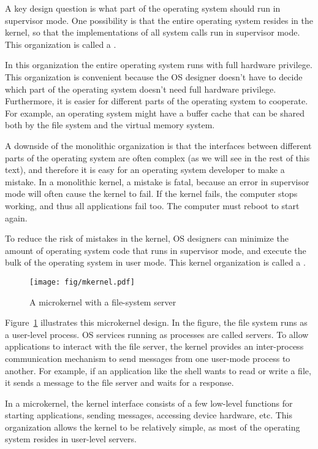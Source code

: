 A key design question is what part of the operating
system should run in supervisor mode. 
One possibility is that the entire operating system resides
in the kernel, so that the implementations of all system calls
run in supervisor mode.
This organization is called a
.

In this organization the entire operating system runs with full hardware
privilege. This organization is convenient because the OS designer doesn't have
to decide which part of the operating system doesn't need full hardware
privilege.  Furthermore, it is easier for different parts of the operating system to
cooperate.  For example, an operating system might have a buffer cache that can
be shared both by the file system and the virtual memory system. 

A downside of the monolithic organization is that the interfaces between
different parts of the operating system are often complex (as we will see in the
rest of this text), and therefore it is easy for an operating system developer
to make a mistake.  In a monolithic kernel, a mistake is fatal, because an error
in supervisor mode will often cause the kernel to fail.  If the kernel fails,
the computer stops working, and thus all applications fail too.  The computer
must reboot to start again.

To reduce the risk of mistakes in the kernel, OS designers can minimize the
amount of operating system code that runs in supervisor mode, and execute the
bulk of the operating system in user mode.
This kernel organization is called a
.

\begin{figure}[t]
\center
\texttt{[image: fig/mkernel.pdf]}
\caption{A microkernel with a file-system server}
\label{fig:mkernel}
\end{figure}

Figure~\ref{fig:mkernel}
illustrates this microkernel design.  In the figure, the file system runs as a
user-level process.  OS services running as processes are called servers.
To allow applications to interact with the
file server, the kernel provides an inter-process communication
mechanism to send messages from one
user-mode process to another.  For example, if an application like the shell
wants to read or write a file, it sends a message to the file server and waits
for a response. 

In a microkernel, the kernel interface consists of a few low-level
functions for starting applications, sending messages,
accessing device hardware, etc.  This organization allows the kernel to be 
relatively simple, as most of the operating system
resides in user-level servers.

